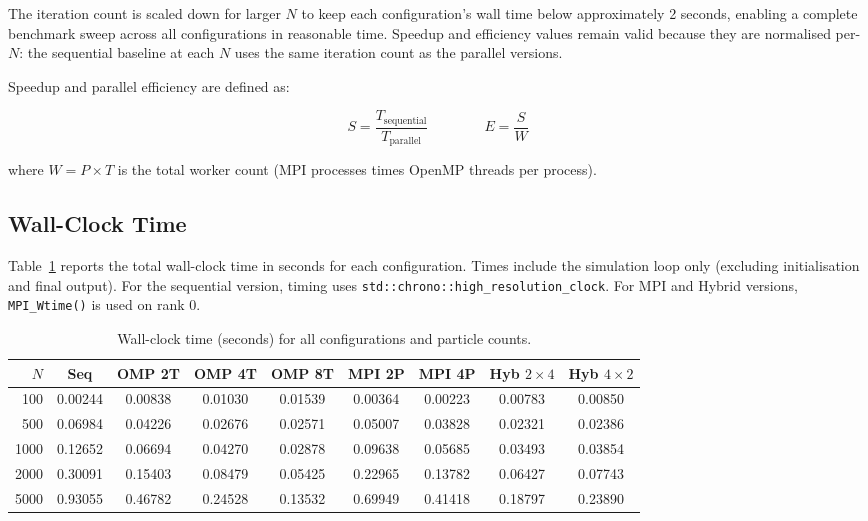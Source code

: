 ﻿\documentclass[12pt,a4paper]{article}
\begin{document}
The iteration count is scaled down for larger $N$ to keep each configuration's
wall time below approximately 2 seconds, enabling a complete benchmark sweep
across all configurations in reasonable time. Speedup and efficiency values
remain valid because they are normalised per-$N$: the sequential baseline
at each $N$ uses the same iteration count as the parallel versions.

Speedup and parallel efficiency are defined as:

\begin{equation}
    S = \frac{T_{\text{sequential}}}{T_{\text{parallel}}}
    \qquad\qquad
    E = \frac{S}{W}
\end{equation}

where $W = P \times T$ is the total worker count (MPI processes times OpenMP
threads per process).

\subsection{Wall-Clock Time}

Table~\ref{tab:walltime} reports the total wall-clock time in seconds for
each configuration. Times include the simulation loop only (excluding
initialisation and final output). For the sequential version, timing uses
\texttt{std::chrono::high\_resolution\_clock}. For MPI and Hybrid versions,
\texttt{MPI\_Wtime()} is used on rank 0.

\begin{table}[H]
\centering
\caption{Wall-clock time (seconds) for all configurations and particle counts.}
\label{tab:walltime}
\begin{tabular}{rcccccccc}
    \toprule
    $N$ & Seq & OMP 2T & OMP 4T & OMP 8T & MPI 2P & MPI 4P
        & Hyb $2{\times}4$ & Hyb $4{\times}2$ \\
    \midrule
    100  & 0.00244 & 0.00838 & 0.01030 & 0.01539
         & 0.00364 & 0.00223 & 0.00783 & 0.00850 \\
    500  & 0.06984 & 0.04226 & 0.02676 & 0.02571
         & 0.05007 & 0.03828 & 0.02321 & 0.02386 \\
    1000 & 0.12652 & 0.06694 & 0.04270 & 0.02878
         & 0.09638 & 0.05685 & 0.03493 & 0.03854 \\
    2000 & 0.30091 & 0.15403 & 0.08479 & 0.05425
         & 0.22965 & 0.13782 & 0.06427 & 0.07743 \\
    5000 & 0.93055 & 0.46782 & 0.24528 & 0.13532
         & 0.69949 & 0.41418 & 0.18797 & 0.23890 \\
    \bottomrule
\end{tabular}
\end{table}
\end{document}
